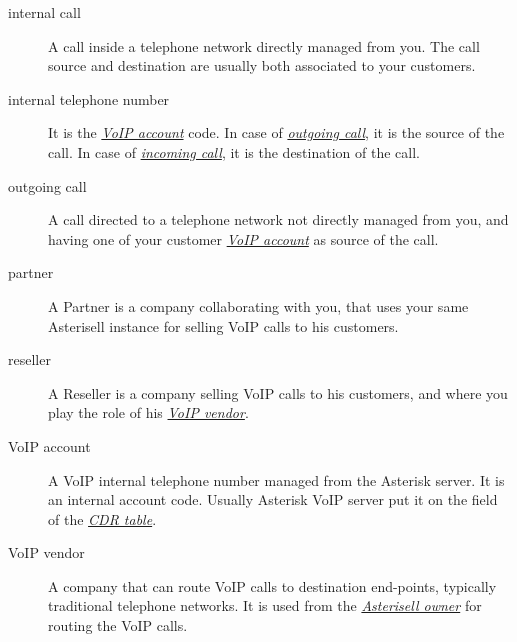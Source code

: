 \documentclass[letterpaper,10pt,english]{sphinxmanual}
\begin{document}
\begin{description}
\item[{internal call}] \leavevmode{}\label{index:term-internal-call}
A call inside a telephone network directly managed from you. The call source and destination are usually both associated to your customers.


\item[{internal telephone number}] \leavevmode{}\label{index:term-internal-telephone-number}
It is the {\hyperref[index:term-voip-account]{\emph{VoIP account}}} code. In case of {\hyperref[index:term-outgoing-call]{\emph{outgoing call}}}, it is the source of the call. In case of {\hyperref[index:term-incoming-call]{\emph{incoming call}}}, it is the destination of the call.


\item[{outgoing call}] \leavevmode{}\label{index:term-outgoing-call}
A call directed to a telephone network not directly managed from you, and having one of your customer {\hyperref[index:term-voip-account]{\emph{VoIP account}}} as source of the call.


\item[{partner}] \leavevmode{}\label{index:term-partner}
A Partner is a company collaborating with you, that uses your same Asterisell instance for selling VoIP calls to his customers.


\item[{reseller}] \leavevmode{}\label{index:term-reseller}
A Reseller is a company selling VoIP calls to his customers, and where you play the role of his {\hyperref[index:term-voip-vendor]{\emph{VoIP vendor}}}.


\item[{VoIP account}] \leavevmode{}\label{index:term-voip-account}
A VoIP internal telephone number managed from the Asterisk server.
It is an internal account code. Usually Asterisk VoIP server put it on the  field of the {\hyperref[index:term-cdr-table]{\emph{CDR table}}}.


\item[{VoIP vendor}] \leavevmode{}\label{index:term-voip-vendor}
A company that can route VoIP calls to destination end-points, typically traditional telephone networks. It is used from the {\hyperref[index:term-asterisell-owner]{\emph{Asterisell owner}}} for routing the VoIP calls.

\end{description}



\renewcommand{\indexname}{Index}
\printindex
\end{document}
